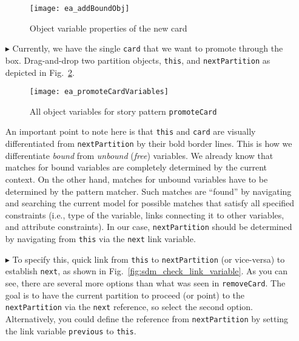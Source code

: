 \begin{itemize}
\begin{figure}[htbp]
\begin{center}
  \texttt{[image: ea\_addBoundObj]}
  \caption{Object variable properties of the new card}
  \label{fig:sdm_new_card_properties}
\end{center}
\end{figure}

\vspace{0.5cm}

\item[$\blacktriangleright$] Currently, we have the single \texttt{card} that we want to promote through the box. Drag-and-drop two partition objects,
\texttt{this}, and \texttt{nextPartition} as depicted in Fig.~\ref{fig:sdm_check_complete_sp}.

\vspace{0.5cm}

\begin{figure}[htbp]
\begin{center}
  \texttt{[image: ea\_promoteCardVariables]}
  \caption{All object variables for story pattern \texttt{promoteCard}}
  \label{fig:sdm_check_complete_sp}
\end{center}
\end{figure}

An important point to note here is that \texttt{this} and \texttt{card} are visually differentiated from \texttt{nextPartition} by
their bold border lines. This is how we differentiate \emph{bound} from \emph{unbound} (\emph{free}) variables. We already know that matches for bound
variables are completely determined by the current context. On the other hand, matches for unbound variables have to be determined by the pattern matcher. Such
matches are ``found'' by navigating and searching the current model for possible matches that satisfy all specified constraints (i.e., type of the variable,
links connecting it to other variables, and attribute constraints). In our case, \texttt{nextPartition} should be determined by navigating from
\texttt{this} via the \texttt{next} link variable.

\vspace{0.5cm}

\item[$\blacktriangleright$] To specify this, quick link from \texttt{this} to \texttt{nextPartition} (or vice-versa) to establish
\texttt{next}, as shown in Fig.~\ref{fig:sdm_check_link_variable}. As you can see, there are several more options than what was seen in
\texttt{removeCard}. The goal is to have the current partition to proceed (or point) to the \texttt{nextPartition} via the \texttt{next} reference, so select
the second option. Alternatively, you could define the reference from \texttt{nextPartition} by setting the link variable \texttt{previous} to \texttt{this}.


\end{itemize}
